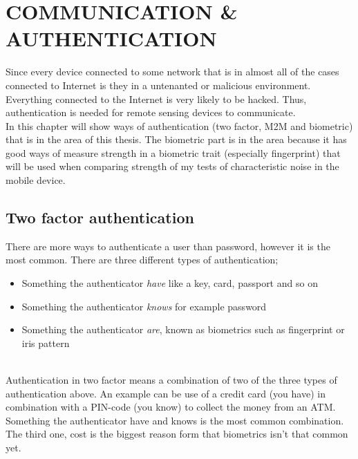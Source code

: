 \chapter{COMMUNICATION \& AUTHENTICATION}\label{cha:auth} 
Since every device connected to some network that is in almost all of the cases connected to Internet is they in a untenanted or malicious environment. Everything connected to the Internet is very likely to be hacked. Thus, authentication is needed for remote sensing devices to communicate. \cite[]{auth:M2Mcom}\\
In this chapter will show ways of authentication (two factor, M2M and biometric) that is in the area of this thesis. The biometric part is in the area because it has good ways of measure strength in a biometric trait (especially fingerprint) that will be used when comparing strength of my tests of characteristic noise in the mobile device.

\section{Two factor authentication}\label{sec:2fauth} 
There are more ways to authenticate a user than password, however it is the most common. There are three different types of authentication; 
\begin{itemize}
	\item Something the authenticator \textit{have} like a key, card, passport and so on
	\item Something the authenticator \textit{knows} for example password
	\item Something the authenticator \textit{are}, known as biometrics such as fingerprint or iris pattern
\end{itemize}
\cite[p.~31]{rosssec} \\
Authentication in two factor means a combination of two of the three types of authentication above. An example can be use of a credit card (you have) in combination with a PIN-code (you know) to collect the money from an ATM. Something the authenticator have and knows is the most common combination. The third one, cost is the biggest reason form that biometrics isn't that common yet.
\cite[p.~47]{rosssec}

